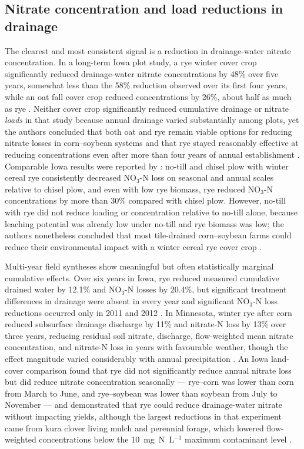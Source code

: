 \subsection{Nitrate concentration and load reductions in drainage}
The clearest and most consistent signal is a reduction in drainage-water nitrate concentration. In a long-term Iowa plot study, a rye winter cover crop significantly reduced drainage-water nitrate concentrations by 48\% over five years, somewhat less than the 58\% reduction observed over its first four years, while an oat fall cover crop reduced concentrations by 26\%, about half as much as rye \parencite{Kaspar2012}. Neither cover crop significantly reduced cumulative drainage or nitrate \emph{loads} in that study because annual drainage varied substantially among plots, yet the authors concluded that both oat and rye remain viable options for reducing nitrate losses in corn--soybean systems and that rye stayed reasonably effective at reducing concentrations even after more than four years of annual establishment \parencite{Kaspar2012}. Comparable Iowa results were reported by \textcite{Waring2020}: no-till and chisel plow with winter cereal rye consistently decreased NO$_3$-N loss on seasonal and annual scales relative to chisel plow, and even with low rye biomass, rye reduced NO$_3$-N concentrations by more than 30\% compared with chisel plow. However, no-till with rye did not reduce loading or concentration relative to no-till alone, because leaching potential was already low under no-till and rye biomass was low; the authors nonetheless concluded that most tile-drained corn--soybean farms could reduce their environmental impact with a winter cereal rye cover crop \parencite{Waring2020}.

Multi-year field syntheses show meaningful but often statistically marginal cumulative effects. Over six years in Iowa, rye reduced measured cumulative drained water by 12.1\% and NO$_3$-N losses by 20.4\%, but significant treatment differences in drainage were absent in every year and significant NO$_3$-N loss reductions occurred only in 2011 and 2012 \parencite{MartinezFeria2016}. In Minnesota, winter rye after corn reduced subsurface drainage discharge by 11\% and nitrate-N loss by 13\% over three years, reducing residual soil nitrate, discharge, flow-weighted mean nitrate concentration, and nitrate-N loss in years with favourable weather, though the effect magnitude varied considerably with annual precipitation \parencite{Strock2004}. An Iowa land-cover comparison found that rye did not significantly reduce annual nitrate loss but did reduce nitrate concentration seasonally --- rye--corn was lower than corn from March to June, and rye--soybean was lower than soybean from July to November --- and demonstrated that rye could reduce drainage-water nitrate without impacting yields, although the largest reductions in that experiment came from kura clover living mulch and perennial forage, which lowered flow-weighted concentrations below the 10~mg~N~L$^{-1}$ maximum contaminant level \parencite{Qi2011b}.

